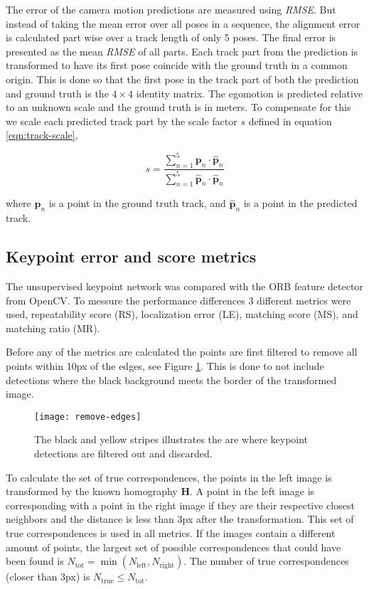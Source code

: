 The error of the camera motion predictions are measured using \textit{RMSE}. But instead of taking the mean error over all poses in a sequence, the alignment error is calculated part wise over a track length of only 5 poses. The final error is presented as the mean \textit{RMSE} of all parts. Each track part from the prediction is transformed to have its first pose coincide with the ground truth in a common origin. This is done so that the first pose in the track part of both the prediction and ground truth is the ${4\times 4}$ identity matrix. The egomotion is predicted relative to an unknown scale and the ground truth is in meters. To compensate for this we scale each predicted track part by the scale factor $s$ defined in equation \ref{eqn:track-scale},

\begin{equation}
s = \frac{\sum_{n=1}^{5} \textbf{p}_n\cdot \hat{\textbf{p}}_n}{\sum_{n=1}^{5} \hat{\textbf{p}}_n\cdot \hat{\textbf{p}}_n}
\label{eqn:track-scale}
\end{equation}

where $\textbf{p}_n$ is a point in the ground truth track, and $\hat{\textbf{p}}_n$ is a point in the predicted track.

\subsection{Keypoint error and score metrics}\label{sec:keypointmetrics}

The unsupervised keypoint network was compared with the ORB feature detector from OpenCV. To messure the performance differences 3 different metrics were used, repeatability score (RS), localization error (LE), matching score (MS), and matching ratio (MR).

Before any of the metrics are calculated the points are first filtered to remove all points within 10px of the edges, see Figure \ref{fig:remove-edges}. This is done to not include detections where the black background meets the border of the transformed image.

\begin{figure}[H]
	\centering
	\texttt{[image: remove-edges]}
	\caption{The black and yellow stripes illustrates the are where keypoint detections are filtered out and discarded.}
	\label{fig:remove-edges}
\end{figure}

To calculate the set of true correspondences, the points in the left image is transformed by the known homography $\textbf{H}$. A point in the left image is corresponding with a point in the right image if they are their respective closest neighbors and the distance is less than 3px after the transformation. This set of true correspondences is used in all metrics. If the images contain a different amount of points, the largest set of possible correspondences that could have been found is $N_{\mathrm{tot}} = \min(N_{\mathrm{left}}, N_{\mathrm{right}})$. The number of true correspondences (closer than 3px) is $N_{\mathrm{true}} \le N_{\mathrm{tot}}$.

